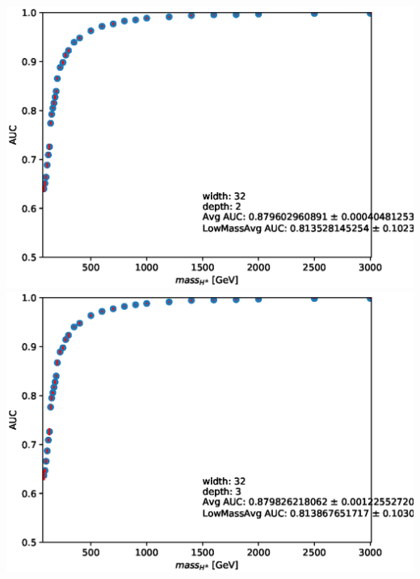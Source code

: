 \documentclass[aspectratio=169,xcolor=table]{beamer}
\begin{document}
    \begin{frame}
      \begin{columns}
      \includegraphics[height=.25\textheight,keepaspectratio=true]{AUC_Plots/model_GB_1024_channel_taulep_mass_80to3000_ntracks_1_nfolds_5_fold_4_nvars_19_batch_size_1024_epochs_1000_dense_layer_size_32_activation_function_LeakyRelu_depth_2_loss_binary_crossentropy_dropout_0.1_alpha_0.05.eps}
      \includegraphics[height=.25\textheight,keepaspectratio=true]{AUC_Plots/model_GB_1024_channel_taulep_mass_80to3000_ntracks_1_nfolds_5_fold_4_nvars_19_batch_size_1024_epochs_1000_dense_layer_size_32_activation_function_LeakyRelu_depth_3_loss_binary_crossentropy_dropout_0.1_alpha_0.05.eps}

\end{columns}
\end{frame}
\end{document}
